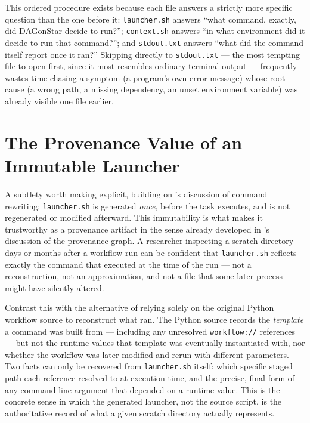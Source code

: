 \begin{practicebox}
This ordered procedure exists because each file answers a strictly more
specific question than the one before it: \texttt{launcher.sh} answers
``what command, exactly, did DAGonStar decide to run?''; \texttt{context.sh}
answers ``in what environment did it decide to run that command?''; and
\texttt{stdout.txt} answers ``what did the command itself report once it
ran?'' Skipping directly to \texttt{stdout.txt} --- the most tempting file to
open first, since it most resembles ordinary terminal output --- frequently
wastes time chasing a symptom (a program's own error message) whose root
cause (a wrong path, a missing dependency, an unset environment variable)
was already visible one file earlier.
\end{practicebox}

\section{The Provenance Value of an Immutable Launcher}

A subtlety worth making explicit, building on 's discussion
of command rewriting: \texttt{launcher.sh} is generated \emph{once}, before
the task executes, and is not regenerated or modified afterward. This
immutability is what makes it trustworthy as a provenance artifact in the
sense already developed in 's discussion of the provenance
graph. A researcher inspecting a scratch directory days or months after a
workflow run can be confident that \texttt{launcher.sh} reflects exactly the
command that executed at the time of the run --- not a reconstruction, not
an approximation, and not a file that some later process might have
silently altered.

Contrast this with the alternative of relying solely on the original Python
workflow source to reconstruct what ran. The Python source records the
\emph{template} a command was built from --- including any unresolved
\texttt{workflow://} references --- but not the runtime values that
template was eventually instantiated with, nor whether the workflow was
later modified and rerun with different parameters. Two facts can only be
recovered from \texttt{launcher.sh} itself: which specific staged path each
reference resolved to at execution time, and the precise, final form of any
command-line argument that depended on a runtime value. This is the concrete
sense in which the generated launcher, not the source script, is the
authoritative record of what a given scratch directory actually represents.

